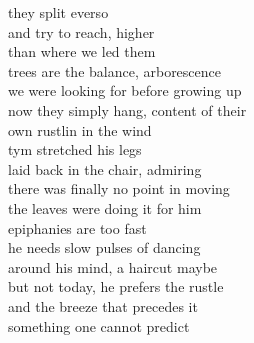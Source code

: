they split everso\\
and try to reach, higher\\
than where we led them\\
trees are the balance, arborescence\\
we were looking for before growing up\\
now they simply hang, content of their\\
own rustlin in the wind\\

tym stretched his legs\\
laid back in the chair, admiring\\
there was finally no point in moving\\
the leaves were doing it for him\\
epiphanies are too fast\\
he needs slow pulses of dancing\\

around his mind, a haircut maybe\\
but not today, he prefers the rustle\\
and the breeze that precedes it\\
something one cannot predict\\
